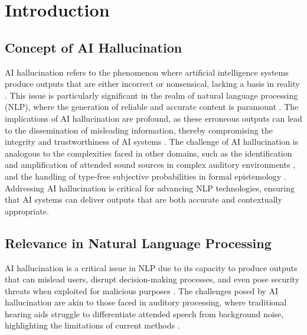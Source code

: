 \section{Introduction} \label{sec:Introduction}


\subsection{Concept of AI Hallucination} \label{subsec:Concept of AI Hallucination}

AI hallucination refers to the phenomenon where artificial intelligence systems produce outputs that are either incorrect or nonsensical, lacking a basis in reality \cite{haghighi2017eegassistedmodulationsoundsources}. This issue is particularly significant in the realm of natural language processing (NLP), where the generation of reliable and accurate content is paramount \cite{wang2024espewrobustcopyrightprotection}. The implications of AI hallucination are profound, as these erroneous outputs can lead to the dissemination of misleading information, thereby compromising the integrity and trustworthiness of AI systems \cite{mcguffie2020radicalizationrisksgpt3advanced}. The challenge of AI hallucination is analogous to the complexities faced in other domains, such as the identification and amplification of attended sound sources in complex auditory environments \cite{haghighi2017eegassistedmodulationsoundsources}, and the handling of type-free subjective probabilities in formal epistemology \cite{cieslinski2022axiomstypefreesubjectiveprobability}. Addressing AI hallucination is critical for advancing NLP technologies, ensuring that AI systems can deliver outputs that are both accurate and contextually appropriate.



\subsection{Relevance in Natural Language Processing} \label{subsec:Relevance in Natural Language Processing}

AI hallucination is a critical issue in NLP due to its capacity to produce outputs that can mislead users, disrupt decision-making processes, and even pose security threats when exploited for malicious purposes \cite{mcguffie2020radicalizationrisksgpt3advanced}. The challenges posed by AI hallucination are akin to those faced in auditory processing, where traditional hearing aids struggle to differentiate attended speech from background noise, highlighting the limitations of current methods \cite{haghighi2017eegassistedmodulationsoundsources}. 



